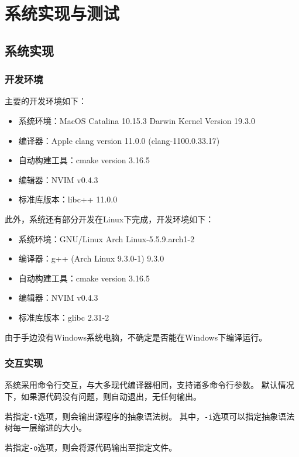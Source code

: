 \chapter{系统实现与测试}

\section{系统实现}

\subsection{开发环境}

主要的开发环境如下：

\begin{itemize}
	\item 系统环境：MacOS Catalina 10.15.3 Darwin Kernel Version 19.3.0
	\item 编译器：Apple clang version 11.0.0 (clang-1100.0.33.17)
	\item 自动构建工具：cmake version 3.16.5
	\item 编辑器：NVIM v0.4.3
	\item 标准库版本：libc++ 11.0.0
\end{itemize}

此外，系统还有部分开发在Linux下完成，开发环境如下：

\begin{itemize}
	\item 系统环境：GNU/Linux Arch Linux-5.5.9.arch1-2
	\item 编译器：g++ (Arch Linux 9.3.0-1) 9.3.0
	\item 自动构建工具：cmake version 3.16.5
	\item 编辑器：NVIM v0.4.3
	\item 标准库版本：glibc 2.31-2
\end{itemize}

由于手边没有Windows系统电脑，不确定是否能在Windows下编译运行。

\subsection{交互实现}

系统采用命令行交互，与大多现代编译器相同，支持诸多命令行参数。
默认情况下，如果源代码没有问题，则自动退出，无任何输出。

若指定{\tt -t}选项，则会输出源程序的抽象语法树。
其中，{\tt -i}选项可以指定抽象语法树每一层缩进的大小。

若指定{\tt -o}选项，则会将源代码输出至指定文件。


